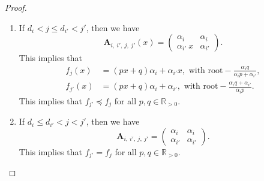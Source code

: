 \documentclass[10pt,a4paper]{amsart}
\def\R{\mathbb{R}}
\begin{document}
\begin{proof}
\begin{enumerate}[\normalfont(i), leftmargin=18pt]
        \item If $d_i < j \leqslant d_{i'} < j'$, then we have  
        \[
        \mathbf{A}_{i, \:i',\: j,\:j'}(x) = 
        \begin{pmatrix}
        \alpha_i  & \alpha_i  \\
        \alpha_{i'} \: x & \alpha_{i'}
        \end{pmatrix}.
        \]
        This implies that 
        \begin{align*}
            f_{j}(x) &= (px+q) \alpha_{i} + \alpha_{i'} x, \text{ with root} - \frac{\alpha_{i} q}{\alpha_{i} p + \alpha_{i'}},\\
            f_{j'}(x) &= (px+q) \alpha_{i} + \alpha_{i'}, \text{ with root} -\frac{\alpha_{i}q + \alpha_{i'}}{\alpha_{i}p}.  
        \end{align*}
        This implies that $f_{j'} \preceq f_{j}$ for all $p, q \in \R_{> 0}$.

        \item If $d_i \leqslant d_{i'} < j < j'$, then we have 
        \[
        \mathbf{A}_{i, \:i',\: j,\:j'} =
        \begin{pmatrix}
        \alpha_i  & \alpha_i  \\
        \alpha_{i'} & \alpha_{i'}
        \end{pmatrix}.
        \]
        This implies that $f_{j'} = f_{j}$ for all $p, q \in \R_{> 0}$. \qedhere
    \end{enumerate}
\end{proof}
\end{document}
